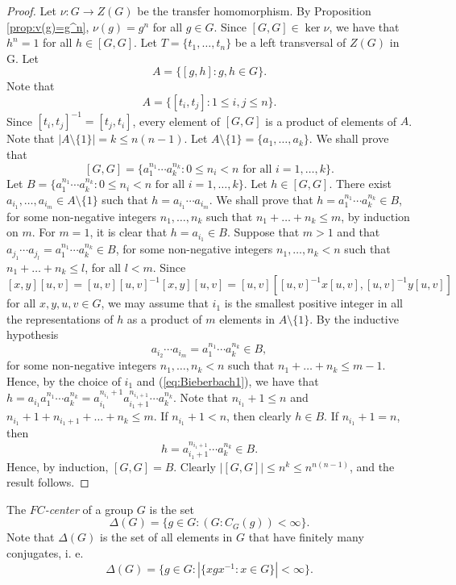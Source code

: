 \begin{proof}
Let $\nu \colon G\to Z(G)$ be the transfer homomorphism. By Proposition \ref{prop:v(g)=g^n}, $\nu(g)=g^n$ for all $g\in G$. Since $[G,G]\in\ker\nu$, we have that $h^n=1$ for all $h\in [G,G]$. Let $T=\{ t_1,\dots ,t_n\}$ be a left transversal of $Z(G)$ in G. Let
\[ A=\{ [g,h] : g,h\in G\}.\]
Note that
\[ A=\{ [t_i,t_j] : 1\leq i,j\leq n\} .\]
Since $[t_i,t_j]^{-1}=[t_j,t_i]$, every element of $[G,G]$ is a product of  elements of $A$. Note that $|A\setminus \{ 1\}|=k\leq n(n-1)$. Let
$A\setminus\{ 1\}= \{ a_1,\dots ,a_k\}$. We shall prove that
\[ [G,G]=\{ a_1^{n_1}\cdots a_k^{n_k} : 0\leq n_i<n \text{ for all } i=1,\dots ,k\}.\]
Let $B=\{ a_1^{n_1}\cdots a_k^{n_k} : 0\leq n_i<n \text{ for all } i=1,\dots ,k\}$. Let $h\in [G,G]$. There exist $a_{i_1},\dots , a_{i_m}\in A\setminus\{ 1\}$ such that $h=a_{i_1}\cdots a_{i_m}$. We shall prove that $h=a_1^{n_1}\cdots a_k^{n_k}\in B$, for some non-negative integers $n_1,\dots ,n_k$ such that $n_1+\dots +n_k\leq m$, by induction on $m$. For $m=1$, it is clear
that $h=a_{i_1}\in B$. Suppose that $m>1$ and that
$a_{j_1}\cdots a_{j_l}=a_1^{n_1}\cdots a_k^{n_k}\in B$, for some non-negative integers $n_1,\dots ,n_k<n$ such that $n_1+\dots +n_k\leq l$, for all $l<m$. Since 
\begin{equation}\label{eq:Bieberbach1}
[x,y][u,v]=[u,v][u,v]^{-1}[x,y][u,v]=[u,v][[u,v]^{-1}x[u,v],[u,v]^{-1} y[u,v]]\end{equation}
for all $x,y,u,v\in G$, we may assume that $i_1$ is the smallest positive integer in all the representations of $h$ as a product of $m$ elements in $A\setminus\{ 1\}$. By the inductive hypothesis
\[a_{i_2}\cdots a_{i_m}=a_1^{n_1}\cdots a_k^{n_k}\in B,\]
for some non-negative integers $n_1,\dots ,n_k<n$ such that $n_1+\dots +n_k\leq m-1$. Hence, by the choice of $i_1$ and (\ref{eq:Bieberbach1}), we have that $h=a_{i_1}a_1^{n_1}\cdots a_k^{n_k}=a_{i_1}^{n_{i_1}+1}a_{i_1+1}^{n_{i_1+1}}\cdots a_k^{n_k}$. Note that $n_{i_1}+1\leq n$ and  $n_{i_1}+1+n_{i_1+1}+\dots +n_k\leq m$.
If $n_{i_1}+1<n$, then clearly $h\in B$. If $n_{i_1}+1=n$, then
\[ h=a_{i_1+1}^{n_{i_1+1}}\cdots a_k^{n_k}\in B.\]
Hence, by induction, $[G,G]=B$. Clearly $|[G,G]|\leq n^k\leq n^{n(n-1)}$, and the result follows.
\end{proof}

The {\em $FC$-center} of a group $G$ is the set
\[ \Delta(G)=\{ g\in G : (G:C_G(g))<\infty\} .\]
Note that $\Delta(G)$ is the set of all elements in $G$ that have finitely many conjugates, i. e.
\[ \Delta(G)=\{ g\in G : |\{xgx^{-1} : x\in G\} |<\infty\}.\]


